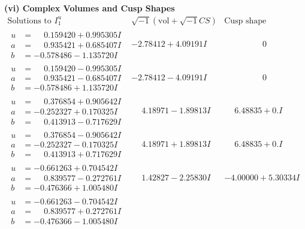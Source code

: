 \documentclass[1p]{elsarticle_modified}
\theoremstyle{definition}
\newcommand{\I}{\sqrt{-1}}
\begin{document}
\newpage\flushleft \textbf{(vi) Complex Volumes and Cusp Shapes}
$$\begin{array}{c|c|c}  
\text{Solutions to }I^u_{1}& \I (\text{vol} + \sqrt{-1}CS) & \text{Cusp shape}\\
 \hline 
\begin{aligned}
u &= \phantom{-}0.159420 + 0.995305 I \\
a &= \phantom{-}0.935421 + 0.685407 I \\
b &= -0.578486 - 1.135720 I\end{aligned}
 & -2.78412 + 4.09191 I & \phantom{-0.000000 } 0 \\ \hline\begin{aligned}
u &= \phantom{-}0.159420 - 0.995305 I \\
a &= \phantom{-}0.935421 - 0.685407 I \\
b &= -0.578486 + 1.135720 I\end{aligned}
 & -2.78412 - 4.09191 I & \phantom{-0.000000 } 0 \\ \hline\begin{aligned}
u &= \phantom{-}0.376854 + 0.905642 I \\
a &= -0.252327 + 0.170325 I \\
b &= \phantom{-}0.413913 - 0.717629 I\end{aligned}
 & \phantom{-}4.18971 - 1.89813 I & \phantom{-}6.48835 + 0. I\phantom{ +0.000000I} \\ \hline\begin{aligned}
u &= \phantom{-}0.376854 - 0.905642 I \\
a &= -0.252327 - 0.170325 I \\
b &= \phantom{-}0.413913 + 0.717629 I\end{aligned}
 & \phantom{-}4.18971 + 1.89813 I & \phantom{-}6.48835 + 0. I\phantom{ +0.000000I} \\ \hline\begin{aligned}
u &= -0.661263 + 0.704542 I \\
a &= \phantom{-}0.839577 - 0.272761 I \\
b &= -0.476366 + 1.005480 I\end{aligned}
 & \phantom{-}1.42827 - 2.25830 I & -4.00000 + 5.30334 I \\ \hline\begin{aligned}
u &= -0.661263 - 0.704542 I \\
a &= \phantom{-}0.839577 + 0.272761 I \\
b &= -0.476366 - 1.005480 I\end{aligned}

\end{array}$$
\end{document}
